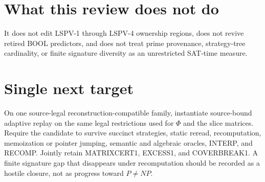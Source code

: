 \documentclass[11pt]{article}
\begin{document}
\section*{What this review does not do}
It does not edit LSPV-1 through LSPV-4 ownership regions, does not revive retired
BOOL predictors, and does not treat prime provenance, strategy-tree cardinality,
or finite signature diversity as an unrestricted SAT-time measure.

\section*{Single next target}
On one source-legal reconstruction-compatible family, instantiate source-bound
adaptive replay on the same legal restrictions used for \(\Phi\) and the slice
matrices. Require the candidate to survive succinct strategies, static reread,
recomputation, memoization or pointer jumping, semantic and algebraic oracles,
INTERP, and RECOMP. Jointly retain MATRIXCERT1, EXCESS1, and COVERBREAK1.
A finite signature gap that disappears under recomputation should be recorded as
a hostile closure, not as progress toward \(P\neq NP\).

\end{document}
